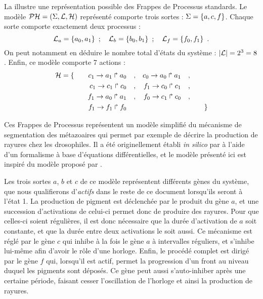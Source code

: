 \begin{example}
  La  illustre une représentation possible des
  Frappes de Processus standards.
  Le modèle $\mathcal{PH} = (\Sigma, \mathcal{L}, \mathcal{H})$ représenté comporte trois sortes :
  $\Sigma = \{ a, c, f \}$.
  Chaque sorte comporte exactement deux processus :
  \[\mathcal{L}_a = \{ a_0, a_1 \} \enspace;\quad
    \mathcal{L}_b = \{ b_0, b_1 \} \enspace;\quad
    \mathcal{L}_f = \{ f_0, f_1 \} \enspace.\]
  On peut notamment en déduire le nombre total d'états du système :
  $|\mathcal{L}| = 2^3 = 8$.
  Enfin, ce modèle comporte 7 actions :
  \begin{align*}
    \mathcal{H} = \{\qquad
      c_1\rightarrow a_1\Rsh a_0\quad, && c_0\rightarrow a_0\Rsh a_1\quad,& \\
      c_1\rightarrow c_1\Rsh c_0\quad, && f_1\rightarrow c_0\Rsh c_1\quad,& \\
      f_1\rightarrow a_0\Rsh a_1\quad, && f_0\rightarrow c_1\Rsh c_0\quad,& \\
      f_1\rightarrow f_1\Rsh f_0\quad\; &&& 
    \qquad\}
  \end{align*}
  
  Ces Frappes de Processus représentent un modèle simplifié du mécanisme
  de segmentation des métazoaires qui permet par exemple de décrire la production de rayures
  chez les drosophiles.
  Il a été originellement établi \textit{in silico} par 
  à l'aide d'un formalisme à base d'équations différentielles,
  et le modèle présenté ici est inspiré du modèle proposé par .
  
  Les trois sortes $a$, $b$ et $c$ de ce modèle représentent différents gènes du système,
  que nous qualifierons d'\emph{actifs} dans le reste de ce document lorsqu'ils seront à l'état 1.
  La production de pigment est déclenchée par le produit du gène $a$,
  et une succession d'activations de celui-ci permet donc de produire des rayures.
  Pour que celles-ci soient régulières, il est donc nécessaire que la durée d'activation
  de $a$ soit constante, et que la durée entre deux activations le soit aussi.
  Ce mécanisme est réglé par le gène $c$ qui inhibe à la fois le gène $a$ à intervalles réguliers,
  et s'inhibe lui-même afin d'avoir le rôle d'une horloge.
  Enfin, le procédé complet est dirigé par le gène $f$ qui, lorsqu'il est actif,
  permet la progression d'un front au niveau duquel les pigments sont déposés.
  Ce gène peut aussi s'auto-inhiber après une certaine période, faisant cesser
  l'oscillation de l'horloge et ainsi la production de rayures.
  

\end{example}
